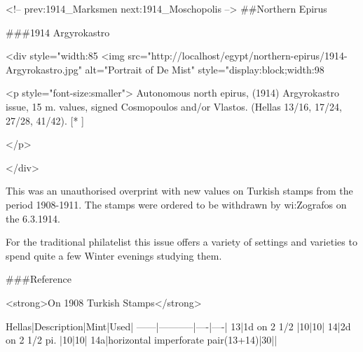 
<!-- 
prev:1914_Marksmen
next:1914_Moschopolis
-->
\#\#Northern Epirus

\#\#\#1914 Argyrokastro

<div style="width:85%
<img src="http://localhost/egypt/northern-epirus/1914-Argyrokastro.jpg" 
alt="Portrait of De Mist" style="display:block;width:98%

<p style="font-size:smaller"> 
Autonomous north epirus, (1914) Argyrokastro issue, 15 m. values, signed Cosmopoulos and/or Vlastos. (Hellas 13/16, 17/24, 27/28, 41/42). [* ]  	
	
</p>
	
</div>

This was an unauthorised overprint with new values on Turkish stamps from the period 1908-1911. The stamps were ordered to be withdrawn by wi:Zografos on the 6.3.1914.

For the traditional philatelist this issue offers a variety of settings and varieties to spend quite a few Winter evenings studying them.

\#\#\#Reference

<strong>On 1908 Turkish Stamps</strong>

Hellas|Description|Mint|Used|
------|-----------|----|----|
13|1d on 2 1/2 |10|10|
14|2d on 2 1/2 pi. |10|10|
14a|horizontal imperforate pair(13+14)|30||

  